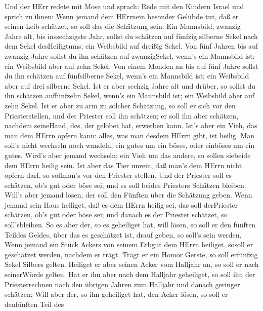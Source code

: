  Und der HErr redete mit Mose und sprach:  Rede
mit den Kindern Israel und sprich zu ihnen: Wenn jemand dem HErrnein
besonder Gelübde tut, daß er seinen Leib schätzet,  so soll
das die Schätzung sein: Ein Mannsbild, zwanzig Jahre alt, bis
inssechzigste Jahr, sollst du schätzen auf fünfzig silberne Sekel nach
dem Sekel desHeiligtums;  ein Weibsbild auf dreißig Sekel.
 Von fünf Jahren bis auf zwanzig Jahre sollst du ihn
schätzen auf zwanzigSekel, wenn's ein Mannsbild ist; ein Weibsbild aber
auf zehn Sekel.  Von einem Monden an bis auf fünf Jahre
sollst du ihn schätzen auf fünfsilberne Sekel, wenn's ein Mannsbild ist;
ein Weibsbild aber auf drei silberne Sekel.  Ist er aber
sechzig Jahre alt und drüber, so sollst du ihn schätzen auffünfzehn
Sekel, wenn's ein Mannsbild ist; ein Weibsbild aber auf zehn Sekel.
 Ist er aber zu arm zu solcher Schätzung, so soll er sich
vor den Priesterstellen, und der Priester soll ihn schätzen; er soll ihn
aber schätzen, nachdem seineHand, des, der gelobet hat, erwerben kann.
 Ist's aber ein Vieh, das man dem HErrn opfern kann: alles,
was man desdem HErrn gibt, ist heilig.  Man soll's nicht
wechseln noch wandeln, ein gutes um ein böses, oder einböses um ein
gutes. Wird's aber jemand wechseln; ein Vieh um das andere, so sollen
siebeide dem HErrn heilig sein.  Ist aber das Tier unrein,
daß man's dem HErrn nicht opfern darf, so sollman's vor den Priester
stellen.  Und der Priester soll es schätzen, ob's gut oder
böse sei; und es soll beides Priesters Schätzen bleiben. 
Will's aber jemand lösen, der soll den Fünften über die Schätzung geben.
 Wenn jemand sein Haus heiliget, daß es dem HErrn heilig
sei, das soll derPriester schätzen, ob's gut oder böse sei; und danach
es der Priester schätzet, so soll'sbleiben.  So es aber
der, so es geheiliget hat, will lösen, so soll er den fünften Teildes
Geldes, über das es geschätzet ist, drauf geben, so soll's sein werden.
 Wenn jemand ein Stück Ackers von seinem Erbgut dem HErrn
heiliget, sosoll er geschätzet werden, nachdem er trägt. Trägt er ein
Homor Gerste, so soll erfünfzig Sekel Silbers gelten. 
Heiliget er aber seinen Acker vom Halljahr an, so soll er nach
seinerWürde gelten.  Hat er ihn aber nach dem Halljahr
geheiliget, so soll ihn der Priesterrechnen nach den übrigen Jahren zum
Halljahr und danach geringer schätzen;  Will aber der, so
ihn geheiliget hat, den Acker lösen, so soll er denfünften Teil des
